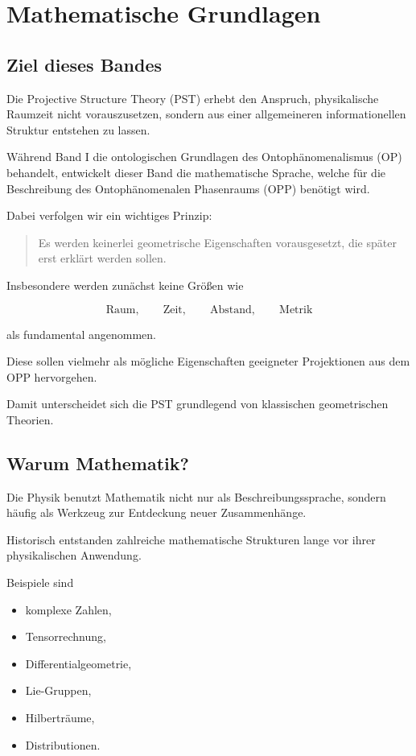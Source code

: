 \chapter{Mathematische Grundlagen}

\section{Ziel dieses Bandes}

Die Projective Structure Theory (PST) erhebt den Anspruch, physikalische
Raumzeit nicht vorauszusetzen, sondern aus einer allgemeineren
informationellen Struktur entstehen zu lassen.

Während Band I die ontologischen Grundlagen des
Ontophänomenalismus (OP) behandelt, entwickelt dieser Band die
mathematische Sprache, welche für die Beschreibung des
Ontophänomenalen Phasenraums (OPP) benötigt wird.

Dabei verfolgen wir ein wichtiges Prinzip:

\begin{quote}
Es werden keinerlei geometrische Eigenschaften vorausgesetzt,
die später erst erklärt werden sollen.
\end{quote}

Insbesondere werden zunächst keine Größen wie

\[
\text{Raum},
\qquad
\text{Zeit},
\qquad
\text{Abstand},
\qquad
\text{Metrik}
\]

als fundamental angenommen.

Diese sollen vielmehr als mögliche Eigenschaften geeigneter
Projektionen aus dem OPP hervorgehen.

Damit unterscheidet sich die PST grundlegend von klassischen
geometrischen Theorien.

\section{Warum Mathematik?}

Die Physik benutzt Mathematik nicht nur als Beschreibungssprache,
sondern häufig als Werkzeug zur Entdeckung neuer Zusammenhänge.

Historisch entstanden zahlreiche mathematische Strukturen lange vor
ihrer physikalischen Anwendung.

Beispiele sind

\begin{itemize}
\item komplexe Zahlen,
\item Tensorrechnung,
\item Differentialgeometrie,
\item Lie-Gruppen,
\item Hilberträume,
\item Distributionen.
\end{itemize}

